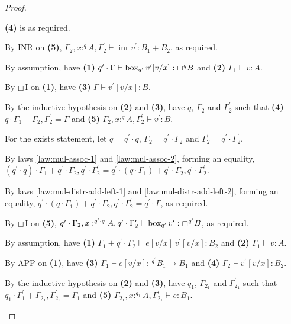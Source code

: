 \documentclass[acmsmall,screen,nonacm]{acmart}
\DeclareMathOperator{\bbox}{\text{box}}
\DeclareMathOperator{\inr}{\text{inr}}
\newcommand{\tee}{\vdash}
\begin{document}
\begin{proof}
\begin{description}
    \textbf{(4)} is as required.
    
    By INR on \textbf{(5)}, $\Gamma_2, x :^q A, \Gamma_2^\prime \tee \inr v^\prime : B_1 + B_2$, as required.
    \\
    \item[Case $\boxempty$I.] 
    By assumption, have \textbf{(1)} $q^\prime \cdot \Gamma \tee \bbox_{q^\prime} v^\prime[v/x] : \boxempty^q B$ and \textbf{(2)} $\Gamma_1 \tee v : A$.

    By $\boxempty$I on \textbf{(1)}, have \textbf{(3)} $\Gamma \tee v^\prime[v/x] : B$.
    
    By the inductive hypothesis on \textbf{(2)} and \textbf{(3)}, have $q$, $\Gamma_2$ and $\Gamma_2^\prime$ such that \textbf{(4)} $q \cdot \Gamma_1 + \Gamma_2, \Gamma_2^\prime = \Gamma$ and \textbf{(5)} $\Gamma_2, x :^q A, \Gamma_2^\prime \tee v^\prime : B$.
    
    For the exists statement, let $q = q^\prime \cdot q$, $\Gamma_2 = q^\prime \cdot \Gamma_2$ and $\Gamma_2^\prime = q^\prime \cdot \Gamma_2^\prime$.

    By laws \ref{law:mul-assoc-1} and \ref{law:mul-assoc-2}, forming an equality, $(q^\prime \cdot q) \cdot \Gamma_1 + q^\prime \cdot \Gamma_2, q^\prime \cdot \Gamma_2^\prime = q^\prime \cdot (q \cdot \Gamma_1) + q^\prime \cdot \Gamma_2, q^\prime \cdot \Gamma_2^\prime$.
    
    By laws \ref{law:mul-distr-add-left-1} and \ref{law:mul-distr-add-left-2}, forming an equality, $q^\prime \cdot (q \cdot \Gamma_1) + q^\prime \cdot \Gamma_2, q^\prime \cdot \Gamma_2^\prime = q^\prime \cdot \Gamma$, as required.
    
    By $\boxempty$I on \textbf{(5)}, $q^\prime \cdot \Gamma_2, x :^{q^\prime \cdot q} A, q^\prime \cdot \Gamma_2^\prime \tee \bbox_{q^\prime} v^\prime : \boxempty^{q^\prime} B$, as required.
    \\
    \item[Case APP.] 
    By assumption, have \textbf{(1)} $\Gamma_1 + q^\prime \cdot \Gamma_2 \tee e[v/x] \, v^\prime[v/x] : B_2$ and \textbf{(2)} $\Gamma_1 \tee v : A$.

    By APP on \textbf{(1)}, have \textbf{(3)} $\Gamma_1 \tee e[v/x] : \,^{q^\prime} B_1 \rightarrow B_1$ and \textbf{(4)} $\Gamma_2 \tee v^\prime[v/x] : B_2$.

    By the inductive hypothesis on \textbf{(2)} and \textbf{(3)}, have $q_1$, $\Gamma_{2_1}$ and $\Gamma_{2_1}^\prime$ such that $q_1 \cdot \Gamma_1^\prime + \Gamma_{2_1}, \Gamma_{2_1}^\prime = \Gamma_1$ and \textbf{(5)} $\Gamma_{2_1}, x :^{q_1} A, \Gamma_{2_1}^\prime \tee e : B_1$.
    

\end{description}
\end{proof}
\end{document}
